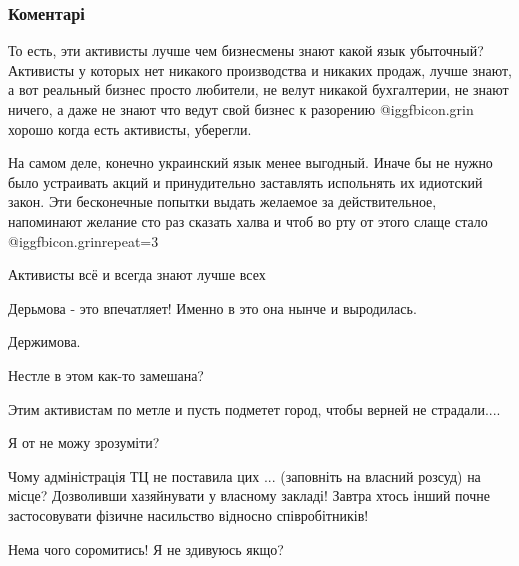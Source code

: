  
 
 
 
 
\subsubsection{Коментарі}

\begin{itemize} %

То есть, эти активисты лучше чем бизнесмены знают какой язык убыточный?
Активисты у которых нет никакого производства и никаких продаж, лучше знают, а
вот реальный бизнес просто любители, не велут никакой бухгалтерии, не знают
ничего, а даже не знают что ведут свой бизнес к разорению @igg{fbicon.grin}  хорошо когда есть
активисты, уберегли.

На самом деле, конечно украинский язык менее выгодный. Иначе бы не нужно было
устраивать акций и принудительно заставлять испольнять их идиотский закон. Эти
бесконечные попытки выдать желаемое за действительное, напоминают желание сто
раз сказать халва и чтоб во рту от этого слаще стало @igg{fbicon.grin}{repeat=3} 

\begin{itemize} %
Активисты всё и всегда знают лучше всех
\end{itemize} %

Дерьмова - это впечатляет! Именно в это она нынче и выродилась.

Держимова.

Нестле в этом как-то замешана?

Этим активистам по метле и пусть подметет город, чтобы верней не страдали....


Я от не можу зрозуміти?

Чому адміністрація ТЦ не поставила цих ... (заповніть на власний розсуд) на
місце? Дозволивши хазяйнувати у власному закладі! Завтра хтось інший почне
застосовувати фізичне насильство відносно співробітників!

Нема чого соромитись! Я не здивуюсь якщо?


\end{itemize}
